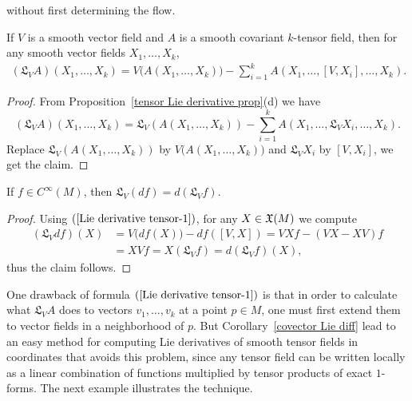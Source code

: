 without first determining the flow.
\begin{corollary}\label{Lie derivative tensor}
If $V$ is a smooth vector field and $A$ is a smooth covariant $k$-tensor field, then for any smooth vector fields $X_1,\dots,X_k$,
\begin{align}\label{Lie derivative tensor-1}
(\mathfrak{L}_VA)(X_1,\dots,X_k)=V\big(A(X_1,\dots,X_k)\big)-\sum_{i=1}^{k}A(X_1,\dots,[V,X_i],\dots,X_k).
\end{align}
\end{corollary}
\begin{proof}
From Proposition~\ref{tensor Lie derivative prop}(d) we have
\[(\mathfrak{L}_VA)(X_1,\dots,X_k)=\mathfrak{L}_V(A(X_1,\dots,X_k))-\sum_{i=1}^{k}A(X_1,\dots,\mathfrak{L}_VX_i,\dots,X_k).\]
Replace $\mathfrak{L}_V(A(X_1,\dots,X_k))$ by $V\big(A(X_1,\dots,X_k)\big)$ and $\mathfrak{L}_VX_i$ by $[V,X_i]$, we get the claim.
\end{proof}
\begin{corollary}\label{covector Lie diff}
If $f\in C^\infty(M)$, then $\mathfrak{L}_V(df)=d(\mathfrak{L}_Vf)$.
\end{corollary}
\begin{proof}
Using $(\ref{Lie derivative tensor-1})$, for any $X\in\mathfrak{X}(M)$ we compute
\begin{align*}
(\mathfrak{L}_Vdf)(X)&=V\big(df(X)\big)-df([V,X])=VXf-(VX-XV)f\\
&=XVf=X(\mathfrak{L}_Vf)=d(\mathfrak{L}_Vf)(X),
\end{align*}
thus the claim follows.
\end{proof}
One drawback of formula $(\ref{Lie derivative tensor-1})$ is that in order to calculate what $\mathfrak{L}_VA$ does to vectors $v_1,\dots,v_k$ at a point $p\in M$, one must first extend them to vector fields in a neighborhood of $p$. But Corollary~\ref{covector Lie diff} lead to an easy method for computing Lie derivatives of smooth tensor fields in coordinates that avoids this problem, since any tensor field can be written locally as a linear combination of functions multiplied by tensor products of exact $1$-forms. The next example illustrates the technique.
